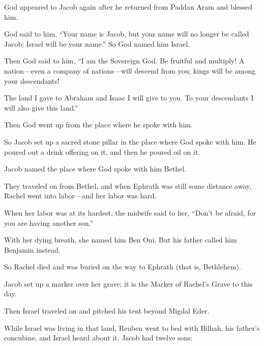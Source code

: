 \begin{scripture}
 God appeared to Jacob again after he returned from Paddan Aram and blessed him.
 God said to him, ``Your name is Jacob, but your name will no longer be called Jacob; Israel will be your name.'' So God named him Israel.
 Then God said to him, ``I am the Sovereign God. Be fruitful and multiply! A nation---even a company of nations---will descend from you; kings will be among your descendants!
 The land I gave to Abraham and Isaac I will give to you. To your descendants I will also give this land.''
 Then God went up from the place where he spoke with him.
 So Jacob set up a sacred stone pillar in the place where God spoke with him. He poured out a drink offering on it, and then he poured oil on it.
 Jacob named the place where God spoke with him Bethel.
\everypar{}

 They traveled on from Bethel, and when Ephrath was still some distance away, Rachel went into labor---and her labor was hard.
 When her labor was at its hardest, the midwife said to her, ``Don't be afraid, for you are having another son.''
 With her dying breath, she named him Ben Oni. But his father called him Benjamin instead.
 So Rachel died and was buried on the way to Ephrath (that is, Bethlehem).
 Jacob set up a marker over her grave; it is the Marker of Rachel's Grave to this day.
\everypar{}

 Then Israel traveled on and pitched his tent beyond Migdal Eder.
\everypar{}

 While Israel was living in that land, Reuben went to bed with Bilhah, his father's concubine, and Israel heard about it. Jacob had twelve sons:
\everypar{}


\end{scripture}
